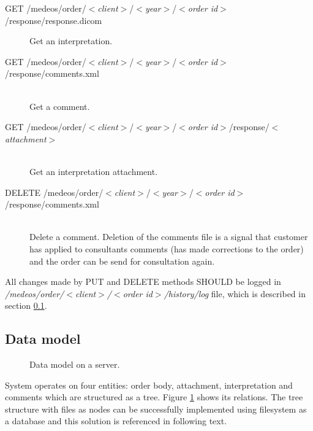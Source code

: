 \documentclass[a4paper]{article}
\begin{document}
\begin{description}
  \item[GET /medeos/order/$<$\emph{client}$>$/$<$\emph{year}$>$/$<$\emph{order id}$>$/response/response.dicom] 
  Get an interpretation.
  
  \item[GET /medeos/order/$<$\emph{client}$>$/$<$\emph{year}$>$/$<$\emph{order id}$>$/response/comments.xml] \hfill \\
  Get a comment.

  \item[GET /medeos/order/$<$\emph{client}$>$/$<$\emph{year}$>$/$<$\emph{order id}$>$/response/$<$\emph{attachment}$>$] \hfill \\ 
  Get an interpretation attachment.

  \item[DELETE /medeos/order/$<$\emph{client}$>$/$<$\emph{year}$>$/$<$\emph{order id}$>$/response/comments.xml]\hfill \\ 
  Delete a comment. Deletion of the comments file is a signal that customer has applied to
  consultants comments (has made corrections to the order) and the order can be send
  for consultation again.

\end{description}

All changes made by PUT and DELETE methods SHOULD be logged in
\emph{/medeos/order/$<$\emph{client}$>$/$<$\emph{order id}$>$/history/log} file, which is
described in section \ref{sec:model}.

\subsection{Data model}
\label{sec:model}
\begin{figure}
\centering
{}
\caption{\label{fig:modeldanych}Data model on a server.}
\end{figure}

System operates on four entities: order body, attachment, interpretation and comments which
are structured as a tree. Figure \ref{fig:modeldanych} shows its relations.
The tree structure with files as nodes can be successfully implemented using
filesystem as a database and this solution is referenced in following text. 
\end{document}
